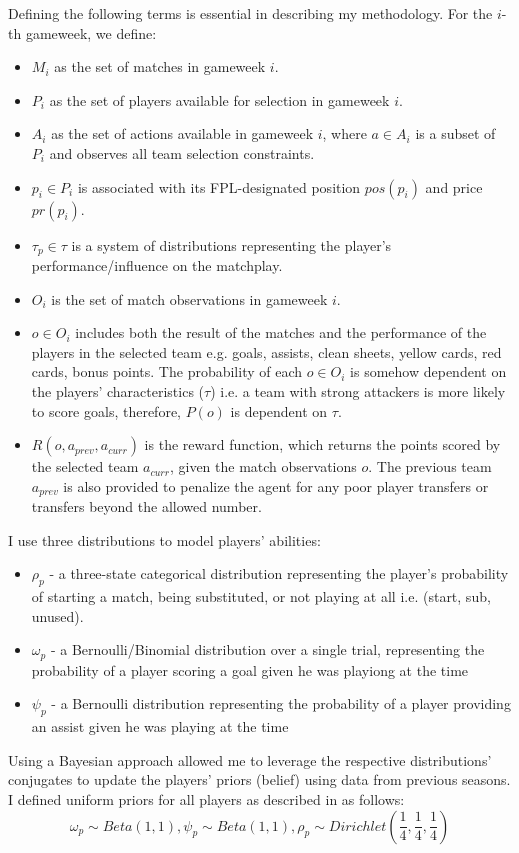 Defining the following terms is essential in describing my methodology. For the $i$-th gameweek, we define:
\begin{itemize}
    \item $M_i$ as the set of matches in gameweek $i$.
    \item $P_i$ as the set of players available for selection in gameweek $i$.
    \item $A_i$ as the set of actions available in gameweek $i$, where $a \in A_i$ is a subset of $P_i$ and observes all team selection constraints.
    \item $p_i \in P_i$ is associated with its FPL-designated position $pos(p_i)$ and price $pr(p_i)$.
    \item $\tau_p \in \tau$ is a system of distributions representing the player's performance/influence on the matchplay.
    \item $O_i$ is the set of match observations in gameweek $i$.
    \item $o \in O_i$ includes both the result of the matches and the performance of the players in the selected team e.g. goals, assists, clean sheets, yellow cards, red cards, bonus points. The probability of each $o \in O_i$ is somehow dependent on the players' characteristics ($\tau$) i.e. a team with strong attackers is more likely to score goals, therefore, $P(o)$ is dependent on $\tau$.
    \item $R(o, a_{prev}, a_{curr})$ is the reward function, which returns the points scored by the selected team $a_{curr}$, given the match observations $o$. The previous team $a_{prev}$ is also provided to penalize the agent for any poor player transfers or transfers beyond the allowed number.
\end{itemize}

I use three distributions to model players' abilities:
\begin{itemize}
    \item $\rho_p$ - a three-state categorical distribution representing the player's probability of starting a match, being substituted, or not playing at all i.e. (start, sub, unused).
    \item $\omega_p$ - a Bernoulli/Binomial distribution over a single trial, representing the probability of a player scoring a goal given he was playiong at the time
    \item $\psi_p$ - a Bernoulli distribution representing the probability of a player providing an assist given he was playing at the time
\end{itemize}
Using a Bayesian approach allowed me to leverage the respective distributions' conjugates to update the players' priors (belief) using data from previous seasons. I defined uniform priors for all players as described in \cite{matthews2012} as follows: $$\omega_p \sim Beta(1, 1), \psi_p \sim Beta(1, 1),  \rho_p \sim Dirichlet(\frac{1}{4}, \frac{1}{4}, \frac{1}{4})$$

